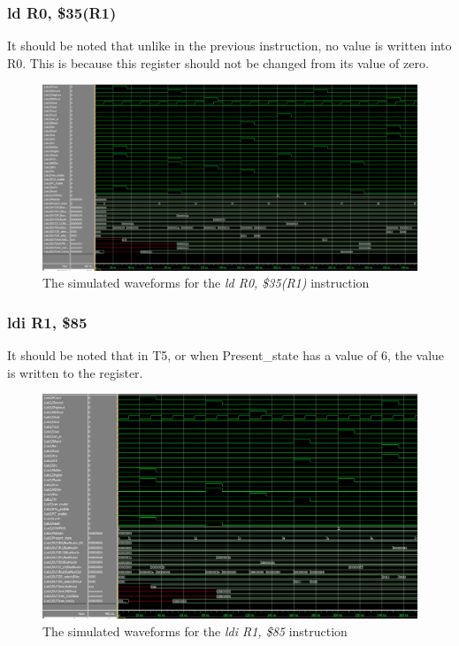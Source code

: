 \documentclass{article}
\begin{document}
        \subsubsection{ld R0, \$35(R1)}
            It should be noted that unlike in the previous instruction, no value is written into R0. This is because this register should not be changed from its value of zero.
            \begin{figure}[h!]
                \begin{center}
                    \includegraphics[width=15cm]{ld_case_2_wave.png}
                    \caption{The simulated waveforms for the \emph{ld R0, \$35(R1)} instruction}
                \end{center}
            \end{figure}

        \subsubsection{ldi R1, \$85}
            It should be noted that in T5, or when Present\_state has a value of 6, the value is written to the register.
            \begin{figure}[h!]
                \begin{center}
                    \includegraphics[width=15cm]{ldi_case_1_wave.png}
                    \caption{The simulated waveforms for the \emph{ldi R1, \$85} instruction}
                \end{center}
            \end{figure}
\end{document}
